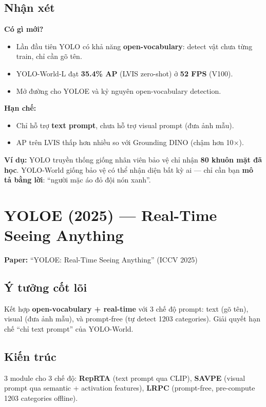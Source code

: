 \documentclass[12pt,a4paper]{report}
\begin{document}
\subsection{Nhận xét}

\textbf{Có gì mới?}
\begin{itemize}
    \item Lần đầu tiên YOLO có khả năng \textbf{open-vocabulary}: detect vật chưa từng train, chỉ cần gõ tên.
    \item YOLO-World-L đạt \textbf{35.4\% AP} (LVIS zero-shot) ở \textbf{52 FPS} (V100).
    \item Mở đường cho YOLOE và kỷ nguyên open-vocabulary detection.
\end{itemize}

\textbf{Hạn chế:}
\begin{itemize}
    \item Chỉ hỗ trợ \textbf{text prompt}, chưa hỗ trợ visual prompt (đưa ảnh mẫu).
    \item AP trên LVIS thấp hơn nhiều so với Grounding DINO (chậm hơn 10$\times$).
\end{itemize}

\textbf{Ví dụ:} YOLO truyền thống giống nhân viên bảo vệ chỉ nhận \textbf{80 khuôn mặt đã học}. YOLO-World giống bảo vệ có thể nhận diện bất kỳ ai --- chỉ cần bạn \textbf{mô tả bằng lời}: ``người mặc áo đỏ đội nón xanh''.

\section{YOLOE (2025) --- Real-Time Seeing Anything}
\textbf{Paper:} ``YOLOE: Real-Time Seeing Anything'' (ICCV 2025) \cite{yoloe}

\subsection{Ý tưởng cốt lõi}
Kết hợp \textbf{open-vocabulary + real-time} với 3 chế độ prompt: text (gõ tên), visual (đưa ảnh mẫu), và prompt-free (tự detect 1203 categories). Giải quyết hạn chế ``chỉ text prompt'' của YOLO-World.

\subsection{Kiến trúc}
3 module cho 3 chế độ: \textbf{RepRTA} (text prompt qua CLIP), \textbf{SAVPE} (visual prompt qua semantic + activation features), \textbf{LRPC} (prompt-free, pre-compute 1203 categories offline).
\end{document}
